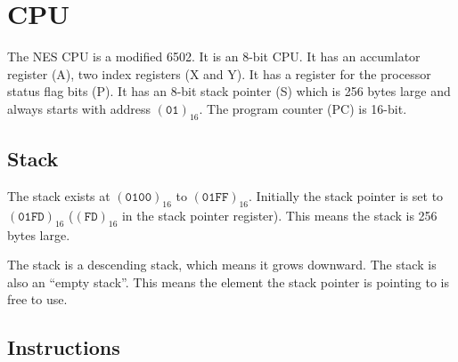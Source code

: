 \documentclass[10pt, draft]{book}
\begin{document}
  \begin{titlepage}
  \end{titlepage}

  \tableofcontents

  \chapter{CPU}

  The NES CPU is a modified 6502. It is an 8-bit CPU. It has an accumlator
  register (A), two index registers (X and Y). It has a register for the
  processor status flag bits (P). It has an 8-bit stack pointer (S) which is
  256 bytes large and always starts with address $(\texttt{01})_{16}$. The
  program counter (PC) is 16-bit.

  \section{Stack}

  The stack exists at $(\texttt{0100})_{16}$ to $(\texttt{01FF})_{16}$.
  Initially the stack pointer is set to $(\texttt{01FD})_{16}$
  ($(\texttt{FD})_{16}$ in the stack pointer register). This means the stack is
  256 bytes large.

  The stack is a descending stack, which means it grows downward. The stack is
  also an ``empty stack''. This means the element the stack pointer is pointing
  to is free to use.


  \section{Instructions}
\end{document}
